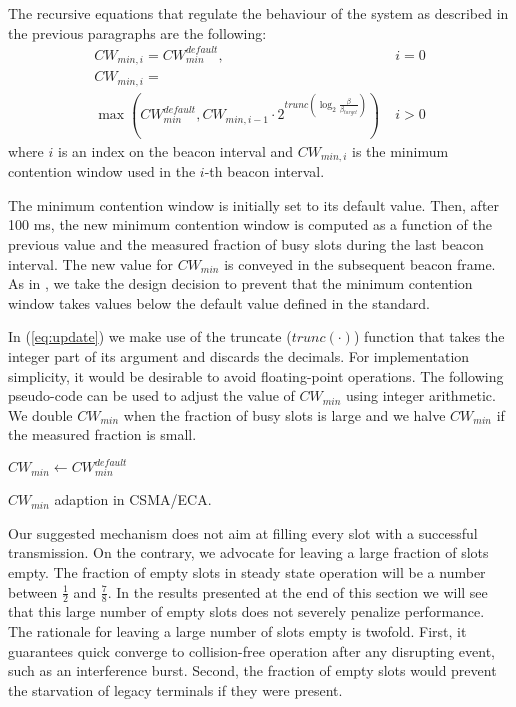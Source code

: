 \documentclass[journal]{IEEEtran}
\begin{document}
The recursive equations that regulate the behaviour of the system as described in the previous paragraphs are the following:
\begin{equation}
\begin{array}{lr}
CW_{min,i}=CW_{min}^{default} ,&  \; i=0 \\
CW_{min,i}=\\
\max (CW_{min}^{default}, CW_{min,i-1} \cdot 2^{trunc (\log_2 \frac{\beta}{\beta_{target} } )} ) & \; i>0
\end{array}
\label{eq:update}
\end{equation}
where $i$ is an index on the beacon interval and $CW_{min, i}$ is the minimum contention window used in the $i$-th beacon interval.

The minimum contention window is initially set to its default value. Then, after 100 ms, the  new minimum contention window is computed as a function of the previous value and the measured fraction of busy slots during the last beacon interval. The new value for $CW_{min}$ is conveyed in the subsequent beacon frame. As in \cite{patras2009cta}, we take the design decision to prevent that the minimum contention window takes values below the default value defined in the standard.

In (\ref{eq:update}) we make use of the truncate ($trunc(\cdot)$) function that takes the integer part of its argument and discards the decimals. For implementation simplicity, it would be desirable to avoid floating-point operations. The following pseudo-code can be used to adjust the value of $CW_{min}$ using integer arithmetic. We double $CW_{min}$ when the fraction of busy slots is large and we halve $CW_{min}$ if the measured fraction is small.

\begin{algorithm}
  $CW_{min} \leftarrow CW_{min}^{default}$\;
  \caption{$CW_{min}$ adaption in CSMA/ECA.}
\label{alg:adaption}
\end{algorithm}

Our suggested mechanism does not aim at filling every slot with a successful transmission. On the contrary, we advocate for leaving a large fraction of slots empty. The fraction of empty slots in steady state operation will be a number between $\frac{1}{2}$ and $\frac{7}{8}$. In the results presented at the end of this section we will see that this large number of empty slots does not severely penalize performance. The rationale for leaving a large number of slots empty is twofold. First, it guarantees quick converge to collision-free operation after any disrupting event, such as an interference burst. Second, the fraction of empty slots would prevent the starvation of legacy terminals if they were present. 
\end{document}
